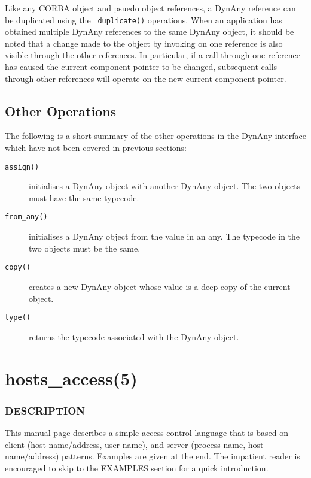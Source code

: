 \documentclass[11pt,twoside,onecolumn]{book}
\begin{document}
Like any CORBA object and psuedo object references, a DynAny reference can
be duplicated using the {\tt \_duplicate()} operations. When an application
has obtained multiple DynAny references to the same DynAny object, it
should be noted that a change made to the object by invoking on one
reference is also visible through the other references. In particular, if
a call through one reference has caused the current component pointer to be
changed, subsequent calls through other references will operate on the new
current component pointer.


\section{Other Operations}

The following is a short summary of the other operations in the DynAny
interface which have not been covered in previous sections:

\begin{description}
\item[{\tt assign()}] initialises a DynAny object with another DynAny
object. The two objects must have the same typecode.

\item[{\tt from\_any()}] initialises a DynAny object from the value in an
any. The typecode in the two objects must be the same.

\item[{\tt copy()}] creates a new DynAny object whose value is a deep copy
of the current object.

\item[{\tt type()}] returns the typecode associated with the DynAny object.

\end{description}

\appendix
\chapter{hosts\_access(5)}

\subsection*{DESCRIPTION}

This manual page describes a simple access control language that is
based on client (host name/address, user name), and server (process
name, host name/address) patterns.  Examples are given at the end. The
impatient reader is encouraged to skip to the EXAMPLES section for a
quick introduction.
\end{document}
